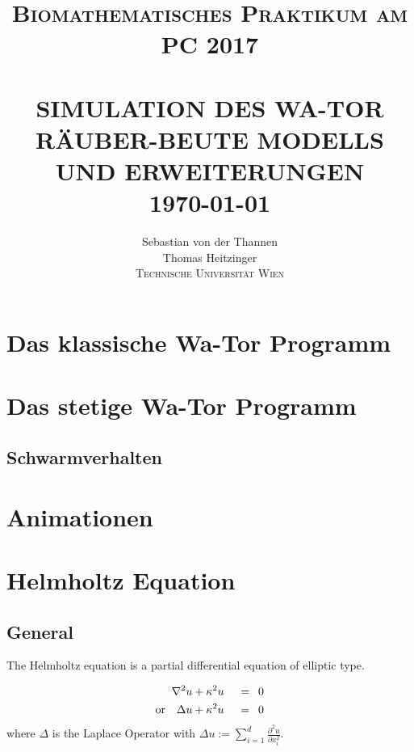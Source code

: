 \documentclass[a4paper,11pt]{article}
\title{ \normalsize \textsc{Biomathematisches Praktikum am PC 2017}    %
            \\[2.0cm]                   %
            \HRule{1pt} \\ [0.5cm]      %
            \LARGE \textbf{\uppercase{Simulation des Wa-Tor Räuber-Beute Modells und Erweiterungen}}    %
            \HRule{1pt} \\ [0.5cm]      %
            \normalsize \today          %
        }
\author{
	        Sebastian von der Thannen\\
	        Thomas Heitzinger\\
	        \vspace{10mm}
	        \textsc{Technische Universität Wien}\\
	}
\makeatletter
\theoremstyle{definition}
\numberwithin{equation}{section}
\def\printtitle{%
    {\centering \@title\par}}
\def\printauthor{%
    {\centering \large \@author}}
\makeatother
\begin{document}
	\thispagestyle{empty}       %

	\printtitle                 %
	\vfill
	\printauthor                %
	\newpage
	
	\tableofcontents
	\newpage
	
	\section{Das klassische Wa-Tor Programm}

	\section{Das stetige Wa-Tor Programm}
	\subsection{Schwarmverhalten}

	\section{Animationen}

	\section{Helmholtz Equation}
	
	\subsection{General}
	
	The Helmholtz equation is a partial differential equation of elliptic type. 
	
	\begin{alignat}{2} \label{eq:helmholtz}
		\nabla^2 u + \kappa^2 u \enspace &&= \enspace 0 \\
		\textnormal{or} \quad \Delta u + \kappa^2 u \enspace &&= \enspace 0 \nonumber
	\end{alignat}
	where $\Delta$ is the Laplace Operator with $ \Delta u := \sum_{i=1}^{d} \frac{\partial^2 u}{\partial x_i^2}$. \newline
	
\end{document}
